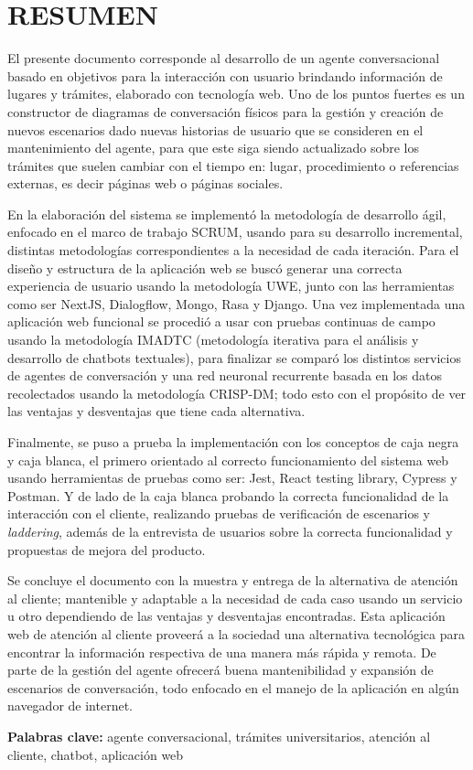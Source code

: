 \documentclass[letter, openright, 12pt]{book}
\begin{document}

\chapter*{RESUMEN}

\noindent
El presente documento corresponde al desarrollo de un agente conversacional basado en objetivos para la interacción con usuario brindando información de lugares y trámites, elaborado con tecnología web. Uno de los puntos fuertes es un constructor de diagramas de conversación físicos para la gestión y creación de nuevos escenarios dado nuevas historias de usuario que se consideren en el mantenimiento del agente, para que este siga siendo actualizado sobre los trámites que suelen cambiar con el tiempo en: lugar, procedimiento o referencias externas, es decir páginas web o páginas sociales.
\par\noindent
En la elaboración del sistema se implementó la metodología de desarrollo ágil, enfocado en el marco de trabajo SCRUM, usando para su desarrollo incremental, distintas metodologías correspondientes a la necesidad de cada iteración. Para el diseño y estructura de la aplicación web se buscó generar una correcta experiencia de usuario usando la metodología UWE, junto con las herramientas como ser NextJS, Dialogflow, Mongo, Rasa y Django. Una vez implementada una aplicación web funcional se procedió a usar con pruebas continuas de campo usando la metodología IMADTC (metodología iterativa para el análisis y desarrollo de chatbots textuales), para finalizar se comparó los distintos servicios de agentes de conversación y una red neuronal recurrente basada en los datos recolectados usando la metodología CRISP-DM; todo esto con el propósito de ver las ventajas y desventajas que tiene cada alternativa. 
\par \noindent
Finalmente, se puso a prueba la implementación con los conceptos de caja negra y caja blanca, el primero orientado al correcto funcionamiento del sistema web usando herramientas de pruebas como ser: Jest, React testing library, Cypress y Postman. Y de lado de la caja blanca probando la correcta funcionalidad de la interacción con el cliente, realizando pruebas de verificación de escenarios y \textit{laddering}, además de la entrevista de usuarios sobre la correcta funcionalidad y propuestas de mejora del producto. 
\par \noindent
Se concluye el documento con la muestra y entrega de la alternativa de atención al cliente; mantenible y adaptable a la necesidad de cada caso usando un servicio u otro dependiendo de las ventajas y desventajas encontradas. Esta aplicación web de atención al cliente proveerá a la sociedad una alternativa tecnológica para encontrar la información respectiva de una manera más rápida y remota. De parte de la gestión del agente ofrecerá buena mantenibilidad y expansión de escenarios de conversación, todo enfocado en el manejo de la aplicación en algún navegador de internet. 
\par \noindent
\textbf{Palabras clave:} agente conversacional, trámites universitarios, atención al cliente, chatbot, aplicación web 
\end{document}

